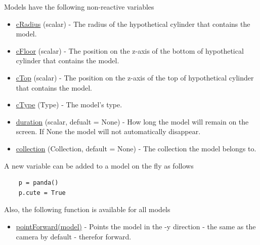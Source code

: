 \documentclass[10pt]{article}
\begin{document}
Models have the following non-reactive variables
\begin{itemize}
    \item \underline{cRadius} (scalar) - The radius of the hypothetical cylinder that contains the model.
    \item \underline{cFloor} (scalar) - The position on the z-axis of the bottom of hypothetical cylinder that contains the model.
    \item \underline{cTop} (scalar) - The position on the z-axis of the top of hypothetical cylinder that contains the model.
    \item \underline{cType} (Type) - The model's type.
    \item \underline{duration} (scalar, defualt = None) - How long the model will remain on the screen.
    If None the model will not automatically disappear.
    \item \underline{collection} (Collection, default = None) - The collection the model belongs to.
\end{itemize}
A new variable can be added to a model on the fly as follows
\begin{lstlisting}
    p = panda()
    p.cute = True
\end{lstlisting}
Also, the following function is available for all models
\begin{itemize}
    \item \underline{pointForward(model)} - Points the model in the -y direction - the same as the camera by default - therefor forward.
\end{itemize}
\end{document}
